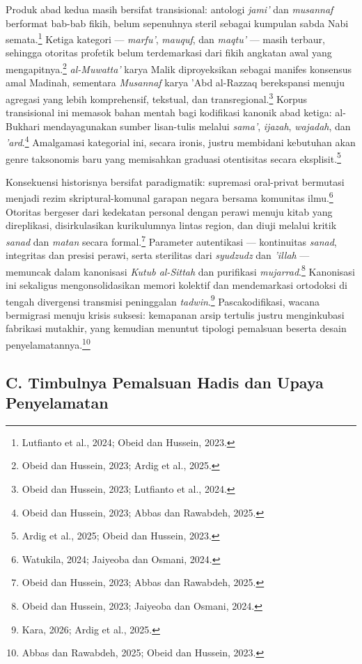 Produk abad kedua masih bersifat transisional: antologi \textit{jami'} dan \textit{musannaf} berformat bab-bab fikih, belum sepenuhnya steril sebagai kumpulan sabda Nabi semata.\footnote{Lutfianto et al., 2024; Obeid dan Hussein, 2023.} Ketiga kategori --- \textit{marfu'}, \textit{mauquf}, dan \textit{maqtu'} --- masih terbaur, sehingga otoritas profetik belum terdemarkasi dari fikih angkatan awal yang mengapitnya.\footnote{Obeid dan Hussein, 2023; Ardig et al., 2025.} \textit{al-Muwatta'} karya Malik diproyeksikan sebagai manifes konsensus amal Madinah, sementara \textit{Musannaf} karya 'Abd al-Razzaq berekspansi menuju agregasi yang lebih komprehensif, tekstual, dan transregional.\footnote{Obeid dan Hussein, 2023; Lutfianto et al., 2024.} Korpus transisional ini memasok bahan mentah bagi kodifikasi kanonik abad ketiga: al-Bukhari mendayagunakan sumber lisan-tulis melalui \textit{sama'}, \textit{ijazah}, \textit{wajadah}, dan \textit{'ard}.\footnote{Obeid dan Hussein, 2023; Abbas dan Rawabdeh, 2025.} Amalgamasi kategorial ini, secara ironis, justru membidani kebutuhan akan genre taksonomis baru yang memisahkan graduasi otentisitas secara eksplisit.\footnote{Ardig et al., 2025; Obeid dan Hussein, 2023.}

Konsekuensi historisnya bersifat paradigmatik: supremasi oral-privat bermutasi menjadi rezim skriptural-komunal garapan negara bersama komunitas ilmu.\footnote{Watukila, 2024; Jaiyeoba dan Osmani, 2024.} Otoritas bergeser dari kedekatan personal dengan perawi menuju kitab yang direplikasi, disirkulasikan kurikulumnya lintas region, dan diuji melalui kritik \textit{sanad} dan \textit{matan} secara formal.\footnote{Obeid dan Hussein, 2023; Abbas dan Rawabdeh, 2025.} Parameter autentikasi --- kontinuitas \textit{sanad}, integritas dan presisi perawi, serta sterilitas dari \textit{syudzudz} dan \textit{'illah} --- memuncak dalam kanonisasi \textit{Kutub al-Sittah} dan purifikasi \textit{mujarrad}.\footnote{Obeid dan Hussein, 2023; Jaiyeoba dan Osmani, 2024.} Kanonisasi ini sekaligus mengonsolidasikan memori kolektif dan mendemarkasi ortodoksi di tengah divergensi transmisi peninggalan \textit{tadwin}.\footnote{Kara, 2026; Ardig et al., 2025.} Pascakodifikasi, wacana bermigrasi menuju krisis suksesi: kemapanan arsip tertulis justru menginkubasi fabrikasi mutakhir, yang kemudian menuntut tipologi pemalsuan beserta desain penyelamatannya.\footnote{Abbas dan Rawabdeh, 2025; Obeid dan Hussein, 2023.}


\subsection*{C. Timbulnya Pemalsuan Hadis dan Upaya Penyelamatan}

